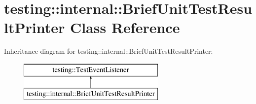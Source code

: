 \hypertarget{classtesting_1_1internal_1_1BriefUnitTestResultPrinter}{}\section{testing\+:\+:internal\+:\+:Brief\+Unit\+Test\+Result\+Printer Class Reference}
\label{classtesting_1_1internal_1_1BriefUnitTestResultPrinter}
Inheritance diagram for testing\+:\+:internal\+:\+:Brief\+Unit\+Test\+Result\+Printer\+:\begin{figure}[H]
\begin{center}
\leavevmode
\includegraphics[height=2.000000cm]{classtesting_1_1internal_1_1BriefUnitTestResultPrinter}
\end{center}
\end{figure}
